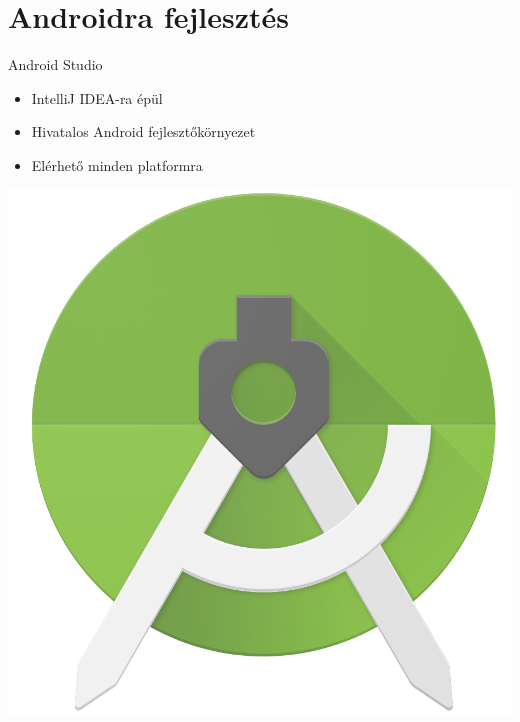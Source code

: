 \documentclass{beamer}
\begin{document}
\section{Androidra fejlesztés}
\begin{frame}[fragile]{Android Studio}
	\begin{minipage}{0.45\textwidth}
		\begin{itemize}
			\item IntelliJ IDEA-ra épül
			\item Hivatalos Android fejlesztőkörnyezet
			\item Elérhető minden platformra
		\end{itemize}
	\end{minipage}
	\begin{minipage}{0.45\textwidth}
		\includegraphics[width=1\linewidth]{figures/ass.png}
	\end{minipage}
\end{frame}
\end{document}
